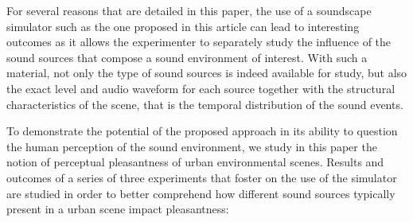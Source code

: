 \documentclass[12pt]{elsarticle}
\newcommand{\ie}{\emph{i.\,e.}}
\begin{document}

For several reasons that are detailed in this paper, the use of a soundscape simulator such as the one proposed in this article can lead to interesting outcomes as it allows the experimenter to separately study  the influence of the sound sources that compose a sound environment of interest. With such a material, not only the type of sound sources is indeed available for study, but also the exact level and audio waveform for each source together with the structural characteristics of the scene, that is the temporal distribution of the sound events.


To demonstrate the potential of the proposed approach in its ability to question the human perception of the sound environment, we study in this paper the notion of perceptual pleasantness of urban environmental scenes. Results and outcomes of a series of three experiments that foster on the use of the simulator are studied in order to better comprehend how different sound sources typically present in a urban scene impact pleasantness:

\end{document}
